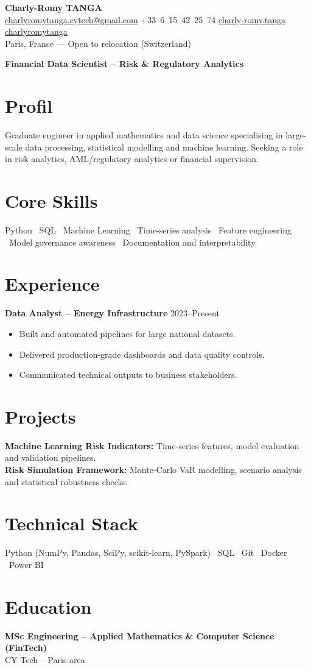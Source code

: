 \documentclass[10pt, letterpaper]{article}
\begin{document}
\begin{center}
\textbf{\LARGE Charly-Romy TANGA}\\[0.15cm]
\mbox{\href{mailto:charlyromytanga.cytech@gmail.com}{\footnotesize\faEnvelope\hspace*{0.1cm}charlyromytanga.cytech@gmail.com}}\kern0.25cm
\mbox{\faPhone\hspace*{0.1cm}+33 6 15 42 25 74}\kern0.25cm
\mbox{\href{https://www.linkedin.com/in/charly-romy-tanga}{\footnotesize\faLinkedin\hspace*{0.1cm}charly-romy.tanga}}\kern0.25cm
\mbox{\href{https://github.com/charlyromytanga}{\footnotesize\faGithub\hspace*{0.1cm}charlyromytanga}}\\[0.15cm]
Paris, France --- Open to relocation (Switzerland)
\end{center}
\textbf{Financial Data Scientist -- Risk \& Regulatory Analytics}
\section*{Profil}
Graduate engineer in applied mathematics and data science specialising in large-scale data processing, statistical modelling and machine learning. Seeking a role in risk analytics, AML/regulatory analytics or financial supervision.
\section*{Core Skills}
Python \textbullet\ SQL \textbullet\ Machine Learning \textbullet\ Time-series analysis \textbullet\ Feature engineering \textbullet\ Model governance awareness \textbullet\ Documentation and interpretability
\section*{Experience}
\textbf{Data Analyst -- Energy Infrastructure} \hfill 2023--Present
\begin{itemize}[leftmargin=0.45cm,itemsep=1pt,topsep=2pt]
\item Built and automated pipelines for large national datasets.
\item Delivered production-grade dashboards and data quality controls.
\item Communicated technical outputs to business stakeholders.
\end{itemize}
\section*{Projects}
\textbf{Machine Learning Risk Indicators:} Time-series features, model evaluation and validation pipelines.\\
\textbf{Risk Simulation Framework:} Monte-Carlo VaR modelling, scenario analysis and statistical robustness checks.
\section*{Technical Stack}
Python (NumPy, Pandas, SciPy, scikit-learn, PySpark) \textbullet\ SQL \textbullet\ Git \textbullet\ Docker \textbullet\ Power BI
\section*{Education}
\textbf{MSc Engineering -- Applied Mathematics \& Computer Science (FinTech)}\\CY Tech -- Paris area
\end{document}
